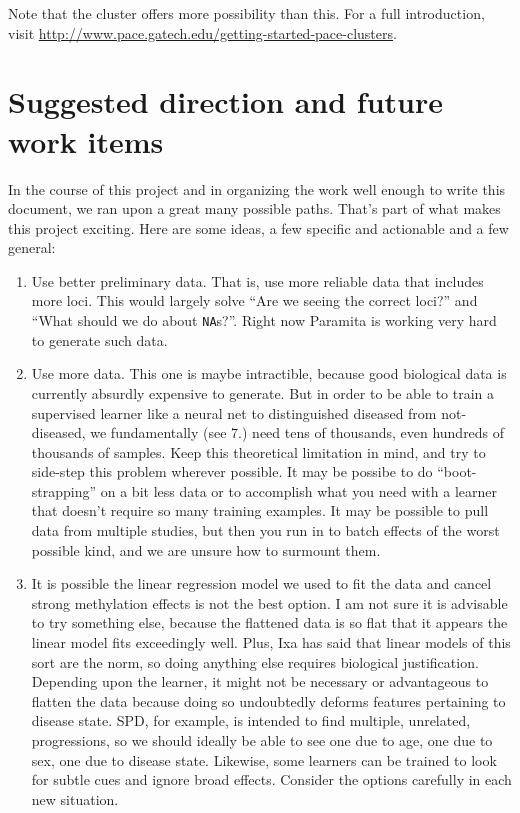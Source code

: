 \documentclass[]{article}
\begin{document}
  Note that the cluster offers more possibility than this. For a full introduction, visit \url{http://www.pace.gatech.edu/getting-started-pace-clusters}.

  \section{Suggested direction and future work items} \label{s:future}

  In the course of this project and in organizing the work well enough to write this document, we ran upon a great many possible paths. That's part of what makes this project exciting. Here are some ideas, a few specific and actionable and a few general:

  \begin{enumerate}
    \item Use better preliminary data. That is, use more reliable data that includes more loci. This would largely solve ``Are we seeing the correct loci?'' and ``What should we do about \texttt{NA}s?''. Right now Paramita is working very hard to generate such data.

    \item Use more data. This one is maybe intractible, because good biological data is currently absurdly expensive to generate. But in order to be able to train a supervised learner like a neural net to distinguished diseased from not-diseased, we fundamentally (see 7.) need tens of thousands, even hundreds of thousands of samples. Keep this theoretical limitation in mind, and try to side-step this problem wherever possible. It may be possibe to do ``boot-strapping'' on a bit less data or to accomplish what you need with a learner that doesn't require so many training examples. It may be possible to pull data from multiple studies, but then you run in to batch effects of the worst possible kind, and we are unsure how to surmount them.

    \item It is possible the linear regression model we used to fit the data and cancel strong methylation effects is not the best option. I am not sure it is advisable to try something else, because the flattened data is so flat that it appears the linear model fits exceedingly well. Plus, Ixa has said that linear models of this sort are the norm, so doing anything else requires biological justification. Depending upon the learner, it might not be necessary or advantageous to flatten the data because doing so undoubtedly deforms features pertaining to disease state. SPD, for example, is intended to find multiple, unrelated, progressions, so we should ideally be able to see one due to age, one due to sex, one due to disease state. Likewise, some learners can be trained to look for subtle cues and ignore broad effects. Consider the options carefully in each new situation.


\end{enumerate}
\end{document}
